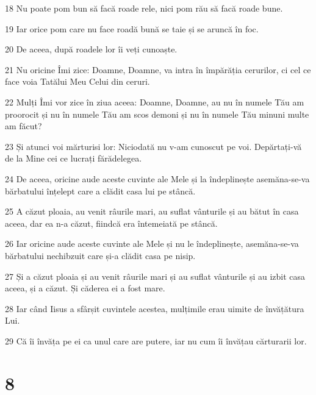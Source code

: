 \par 18 Nu poate pom bun să facă roade rele, nici pom rău să facă roade bune.
\par 19 Iar orice pom care nu face roadă bună se taie și se aruncă în foc.
\par 20 De aceea, după roadele lor îi veți cunoaște.
\par 21 Nu oricine Îmi zice: Doamne, Doamne, va intra în împărăția cerurilor, ci cel ce face voia Tatălui Meu Celui din ceruri.
\par 22 Mulți Îmi vor zice în ziua aceea: Doamne, Doamne, au nu în numele Tău am proorocit și nu în numele Tău am scos demoni și nu în numele Tău minuni multe am făcut?
\par 23 Și atunci voi mărturisi lor: Niciodată nu v-am cunoscut pe voi. Depărtați-vă de la Mine cei ce lucrați fărădelegea.
\par 24 De aceea, oricine aude aceste cuvinte ale Mele și la îndeplinește asemăna-se-va bărbatului înțelept care a clădit casa lui pe stâncă.
\par 25 A căzut ploaia, au venit râurile mari, au suflat vânturile și au bătut în casa aceea, dar ea n-a căzut, fiindcă era întemeiată pe stâncă.
\par 26 Iar oricine aude aceste cuvinte ale Mele și nu le îndeplinește, asemăna-se-va bărbatului nechibzuit care și-a clădit casa pe nisip.
\par 27 Și a căzut ploaia și au venit râurile mari și au suflat vânturile și au izbit casa aceea, și a căzut. Și căderea ei a fost mare.
\par 28 Iar când Iisus a sfârșit cuvintele acestea, mulțimile erau uimite de învățătura Lui.
\par 29 Că îi învăța pe ei ca unul care are putere, iar nu cum îi învățau cărturarii lor.

\chapter{8}

